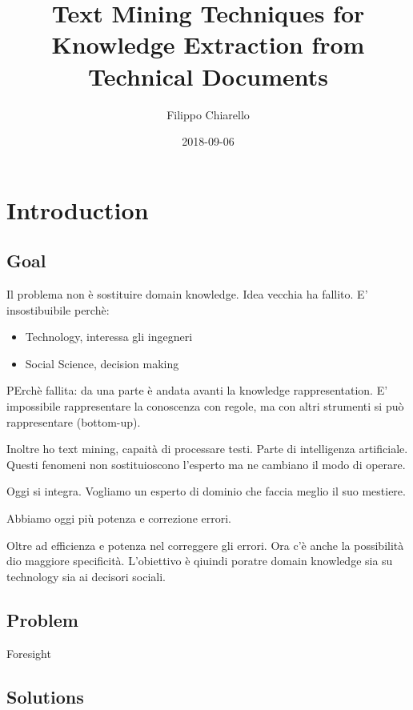 \documentclass[]{book}
\title{Text Mining Techniques for Knowledge Extraction from Technical Documents}
\author{Filippo Chiarello}
\date{2018-09-06}
\providecommand{\tightlist}{%
  \setlength{\itemsep}{0pt}\setlength{\parskip}{0pt}}
\begin{document}
\maketitle

{
\setcounter{tocdepth}{1}
\tableofcontents
}
\chapter{Introduction}\label{introduction}

\section{Goal}\label{goal}

Il problema non è sostituire domain knowledge. Idea vecchia ha fallito.
E' insostibuibile perchè:

\begin{itemize}
\tightlist
\item
  Technology, interessa gli ingegneri
\item
  Social Science, decision making
\end{itemize}

PErchè fallita: da una parte è andata avanti la knowledge
rappresentation. E' impossibile rappresentare la conoscenza con regole,
ma con altri strumenti si può rappresentare (bottom-up).

Inoltre ho text mining, capaità di processare testi. Parte di
intelligenza artificiale. Questi fenomeni non sostituioscono l'esperto
ma ne cambiano il modo di operare.

Oggi si integra. Vogliamo un esperto di dominio che faccia meglio il suo
mestiere.

Abbiamo oggi più potenza e correzione errori.

Oltre ad efficienza e potenza nel correggere gli errori. Ora c'è anche
la possibilità dio maggiore specificità. L'obiettivo è qiuindi poratre
domain knowledge sia su technology sia ai decisori sociali.

\section{Problem}\label{problem}

Foresight

\section{Solutions}\label{solutions}
\end{document}

